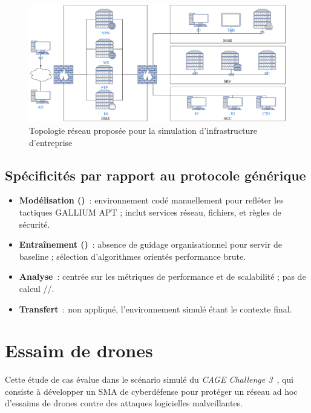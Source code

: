 \begin{figure}[h!]
  \centering
  \includegraphics[width=\linewidth]{figures/topology.pdf}
  \caption{Topologie réseau proposée pour la simulation d’infrastructure d’entreprise}
  \label{fig:scenario_network_topology}
\end{figure}

\subsection{Spécificités par rapport au protocole générique}
\begin{itemize}
  \item \textbf{Modélisation ()}~: environnement codé manuellement pour refléter les tactiques GALLIUM APT ; inclut services réseau, fichiers, et règles de sécurité.
  \item \textbf{Entraînement ()}~: absence de guidage organisationnel pour servir de baseline ; sélection d’algorithmes orientés performance brute.
  \item \textbf{Analyse}~: centrée sur les métriques de performance et de scalabilité ; pas de calcul //.
  \item \textbf{Transfert}~: non appliqué, l’environnement simulé étant le contexte final.
\end{itemize}


\section{Essaim de drones}
\label{sec:drone_swarm}

Cette étude de cas évalue  dans le scénario simulé du \textit{CAGE Challenge 3}~\cite{cage_challenge_3_announcement}, qui consiste à développer un SMA de cyberdéfense pour protéger un réseau ad hoc d’essaims de drones contre des attaques logicielles malveillantes.


